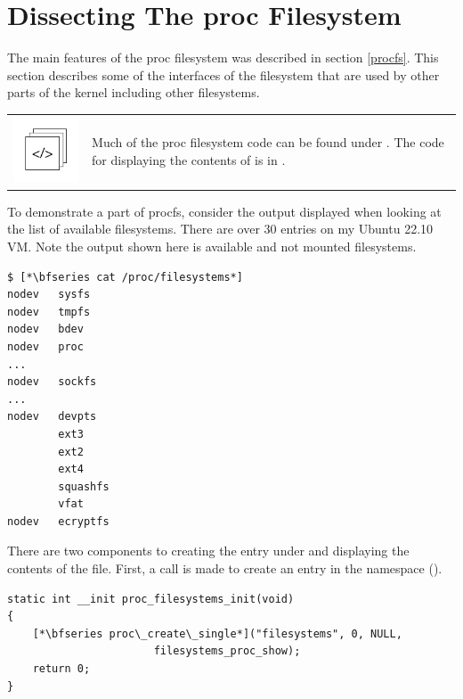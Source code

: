 \section{Dissecting The proc Filesystem}

The main features of the proc filesystem was described in section \ref{procfs}. This section describes some of the interfaces of the filesystem that are used by other parts of the kernel including other filesystems. 

\begin{table}[h]
\begin{tabular}{ll}
\parbox[l]{0.6in}{\includegraphics[scale=0.8]{figures/src-xref.pdf}} & \parbox[l]{4in}{\small{Much of the proc filesystem code can be found under . The code for displaying the contents of  is in .}}
\end{tabular}
\end{table}

To demonstrate a part of procfs, consider the output displayed when looking at the list of available filesystems. There are over 30 entries on my Ubuntu 22.10 VM. Note the output shown here is available and not mounted filesystems.

\begin{lstlisting}
$ [*\bfseries cat /proc/filesystems*]
nodev   sysfs
nodev   tmpfs
nodev   bdev
nodev   proc
...
nodev   sockfs
...
nodev   devpts
        ext3
        ext2
        ext4
        squashfs
        vfat
nodev   ecryptfs
\end{lstlisting}

\noindent
There are two components to creating the  entry under  and displaying the contents of the file. First, a call is made to create an entry in the namespace (). 

\begin{lstlisting}
static int __init proc_filesystems_init(void)
{
    [*\bfseries proc\_create\_single*]("filesystems", 0, NULL, 
                       filesystems_proc_show);
    return 0;
}
\end{lstlisting}

